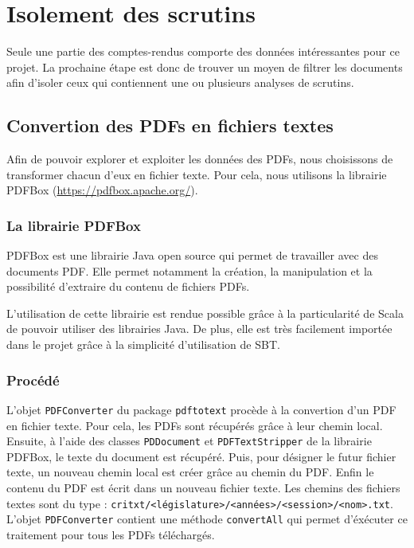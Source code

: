 \section{Isolement des scrutins}

Seule une partie des comptes-rendus comporte des données intéressantes pour ce projet. La prochaine étape est donc de trouver un moyen de filtrer les documents afin d'isoler ceux qui contiennent une ou plusieurs analyses de scrutins.

\subsection{Convertion des PDFs en fichiers textes}

Afin de pouvoir explorer et exploiter les données des PDFs, nous choisissons de transformer chacun d'eux en fichier texte. Pour cela, nous utilisons la librairie PDFBox (\url{https://pdfbox.apache.org/}).

\subsubsection{La librairie PDFBox}

PDFBox est une librairie Java open source qui permet de travailler avec des documents PDF. Elle permet notamment la création, la manipulation et la possibilité d'extraire du contenu de fichiers PDFs.

L'utilisation de cette librairie est rendue possible grâce à la particularité de Scala de pouvoir utiliser des librairies Java. De plus, elle est très facilement importée dans le projet grâce à la simplicité d'utilisation de SBT.

\subsubsection{Procédé}

L'objet \verb|PDFConverter| du package \verb|pdftotext| procède à la convertion d'un PDF en fichier texte.\newline
Pour cela, les PDFs sont récupérés grâce à leur chemin local. Ensuite, à l'aide des classes \verb|PDDocument| et \verb|PDFTextStripper| de la librairie PDFBox, le texte du document est récupéré. Puis, pour désigner le futur fichier texte, un nouveau chemin local est créer grâce au chemin du PDF. Enfin le contenu du PDF est écrit dans un nouveau fichier texte. Les chemins des fichiers textes sont du type : \verb|critxt/<législature>/<années>/<session>/<nom>.txt|. L'objet \verb|PDFConverter| contient une méthode \verb|convertAll| qui permet d'éxécuter ce traitement pour tous les PDFs téléchargés.

